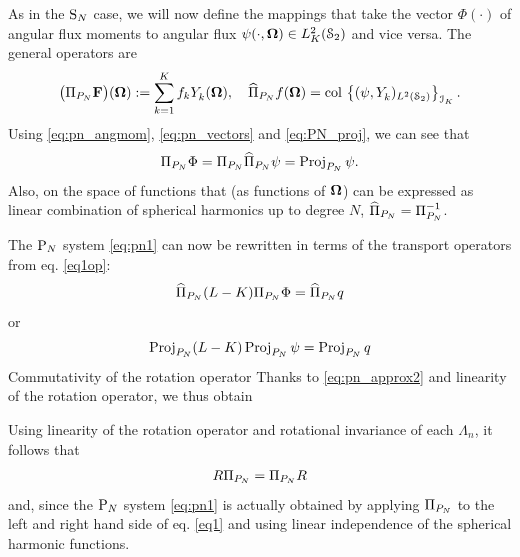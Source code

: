 As in the $\SN$ case, we will now define the mappings that take the vector $\Phi(\cdot)$ of angular flux moments to
angular flux $\psi(\cdot,\bomega)\in\Lp[2]_K(\Sphere)$ and vice versa. The general operators are
$$
\bigl(\PiPN\mat{F}\bigr)(\bomega) := \sum_{k=1}^{ K} f_k\Y{k}{}(\bomega), \quad
\PihPN f(\bomega) = \col \left\{(\psi, \Y{k}{})_{\Lp[2](\Sphere)}\right\}_{\idxset{K}}.
$$
Using \eqref{eq:pn_angmom}, \eqref{eq:pn_vectors} and \eqref{eq:PN_proj}, we can see that 
$$
\PiPN\Phi = \PiPN\PihPN \psi = \Projop\psi.
$$ 
Also, on the space of functions that (as functions of $\bomega$) can be expressed as linear combination of
spherical harmonics up to degree $N$, $\PihPN = \PiPN^{-1}$.

The $\PN$ system \eqref{eq:pn1} can now be rewritten in terms of the transport operators from eq. \eqref{eq1op}:
$$
	\PihPN (L-K) \PiPN\Phi = \PihPN q
$$
or
$$
	\Projop (L-K) \Projop\psi = \Projop q
$$
Commutativity of the rotation operator 
Thanks to \eqref{eq:pn_approx2} and linearity of the rotation operator, we thus obtain

Using linearity of the rotation operator and rotational
invariance of each $\Lambda_n$, it follows that 
$$
	\op{R}\PiPN = \PiPN\op{R}
$$
and, since the $\PN$ system \eqref{eq:pn1} is actually obtained by applying $\PiPN$ to the left and right
hand side of eq. \eqref{eq1} and using linear independence of the spherical harmonic functions. 


